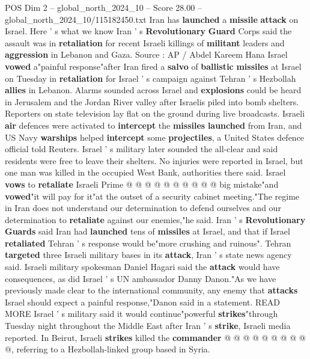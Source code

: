 \begin{textsample}{POS Dim 2 – global\_north\_2024\_10 – Score 28.00 – global\_north\_2024\_10/115182450.txt}  \label{ex:f2_pos_075}
Iran has \textbf{launched} a \textbf{missile} \textbf{attack} on Israel.
Here ' s what we know Iran ' s \textbf{Revolutionary} \textbf{Guard} Corps said the assault was in \textbf{retaliation} for recent Israeli killings of \textbf{militant} leaders and \textbf{aggression} in Lebanon and Gaza.
Source : AP / Abdel Kareem Hana Israel \textbf{vowed} a"painful response"after Iran fired a \textbf{salvo} of \textbf{ballistic} \textbf{missiles} at Israel on Tuesday in \textbf{retaliation} for Israel ' s campaign against Tehran ' s Hezbollah \textbf{allies} in Lebanon.
Alarms sounded across Israel and \textbf{explosions} could be heard in Jerusalem and the Jordan River valley after Israelis piled into bomb shelters.
Reporters on state television lay flat on the ground during live broadcasts.
Israeli \textbf{air} defences were activated to \textbf{intercept} the \textbf{missiles} \textbf{launched} from Iran, and US Navy \textbf{warships} helped \textbf{intercept} some \textbf{projectiles}, a United States defence official told Reuters.
Israel ' s military later sounded the all-clear and said residents were free to leave their shelters.
No injuries were reported in Israel, but one man was killed in the occupied West Bank, authorities there said.
Israel \textbf{vows} to \textbf{retaliate} Israeli Prime @ @ @ @ @ @ @ @ @ @ big mistake"and \textbf{vowed}"it will pay for it"at the outset of a security cabinet meeting."The regime in Iran does not understand our determination to defend ourselves and our determination to \textbf{retaliate} against our enemies,"he said.
Iran ' s \textbf{Revolutionary} \textbf{Guards} said Iran had \textbf{launched} tens of \textbf{missiles} at Israel, and that if Israel \textbf{retaliated} Tehran ' s response would be"more crushing and ruinous".
Tehran \textbf{targeted} three Israeli military bases in its \textbf{attack}, Iran ' s state news agency said.
Israeli military spokesman Daniel Hagari said the \textbf{attack} would have consequences, as did Israel ' s UN ambassador Danny Danon."As we have previously made clear to the international community, any enemy that \textbf{attacks} Israel should expect a painful response,"Danon said in a statement.
READ MORE Israel ' s military said it would continue"powerful \textbf{strikes}"through Tuesday night throughout the Middle East after Iran ' s \textbf{strike}, Israeli media reported.
In Beirut, Israeli \textbf{strikes} killed the \textbf{commander} @ @ @ @ @ @ @ @ @ @, referring to a Hezbollah-linked group based in Syria.

\end{textsample}
